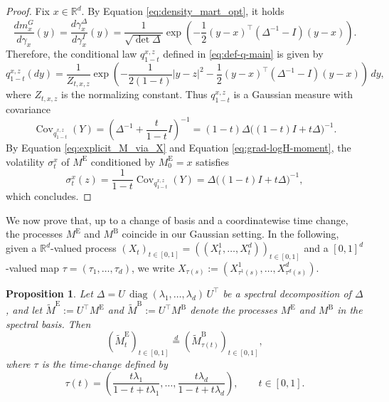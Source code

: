 \documentclass[reqno, a4paper]{amsart}
\theoremstyle{plain}
\newtheorem{proposition}[theorem]{Proposition}
\theoremstyle{definition}
\theoremstyle{remark}
\numberwithin{equation}{section}
\numberwithin{theorem}{section}
\newcommand{\R}{\mathbb{R}}
\DeclareMathOperator{\diag}{diag}
\DeclareMathOperator{\Cov}{Cov}
\begin{document}
	\begin{proof}
		Fix $x\in\R^d$. By Equation \eqref{eq:density_mart_opt}, it holds
		\[
		\frac{dm^G_x}{d\gamma_x}(y) = \frac{d\gamma_x^{\Delta}}{d \gamma_x^I}(y)
		=
		\frac{1}{\sqrt{\det\Delta}}
		\exp\!\left(
		-\frac12 (y-x)^\top(\Delta^{-1}-I)(y-x)
		\right).
		\]
		Therefore, the conditional law $q_{1-t}^{x,z}$ defined in \eqref{eq:def-q-main} is given by
		\[
		q_{1-t}^{x,z}(dy)
		=\frac{1}{Z_{t,x,z}}
		\exp\!\left(
		-\frac{1}{2(1-t)}|y-z|^2
		-\frac12 (y-x)^\top(\Delta^{-1}-I)(y-x)
		\right)\,dy,
		\]
		where $Z_{t,x,z}$ is the normalizing constant.
		Thus $q_{1-t}^{x,z}$ is a Gaussian measure with covariance 
		\[
		\Cov_{q_{1-t}^{x,z}}(Y)
		=
		\left(\Delta^{-1}+\frac{t}{1-t}I\right)^{-1}
		=
		(1-t)\Delta\bigl((1-t)I+t\Delta\bigr)^{-1}.
		\]
		By Equation \eqref{eq:explicit_M_via_X} and Equation \eqref{eq:grad-logH-moment}, the volatility $\sigma_t^x$ of $M^{\mathrm{E}}$ conditioned by $M_0^{\mathrm E} = x$ satisfies 
        \begin{equation*}
        \sigma^{x}_t(z)
		=
		\frac{1}{1-t}\Cov_{q_{1-t}^{x,z}}(Y)
		=
		\Delta\bigl((1-t)I+t\Delta\bigr)^{-1},
        \end{equation*}
        which concludes.
	\end{proof} 
	We now prove that, up to a change of basis and a coordinatewise time change, the processes $M^\mathrm{E}$ and $M^\mathrm{B}$ coincide in our Gaussian setting. In the following, given a $\R^d$-valued process $(X_t)_{t \in [0,1]} = ((X^1_t,\dots,X^d_t))_{t\in [0,1]}$ and a $[0,1]^d$-valued map $\tau = (\tau_1,\dots,\tau_d)$, we write $X_{\tau(s)} := \left(X_{\tau^1(s)}^1,\dots,X_{\tau^d(s)}^d\right)$.
    
	\begin{proposition}
		Let
		$
		\Delta=U\,\diag(\lambda_1,\dots,\lambda_d)\,U^\top
		$ be a spectral decomposition of $\Delta$, and let $\tilde M^{\mathrm E} := U^\top M^{\mathrm E}$ and $\tilde M^{\mathrm B} := U^\top M^{\mathrm B}$ denote the processes $ M^{\mathrm E}$ and $ M^{\mathrm B}$ in the spectral basis.
        Then
        \[
		\left(\tilde M_t^{\mathrm E}\right)_{t\in[0,1]}
		\stackrel{d}{=}
		\left(\tilde M_{\tau(t)}^{\mathrm B}\right)_{t \in[0,1]},
		\]
        where $\tau$ is the time-change defined by
        $$\tau(t) = \left(\frac{t \lambda_1}{1-t+t \lambda_1},\dots, \frac{t \lambda_d}{1-t+t \lambda_d}\right), \qquad t \in [0,1].$$
	\end{proposition}
	
\end{document}
